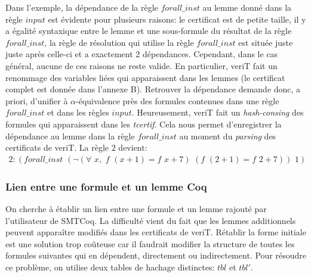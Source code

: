 \documentclass[11pt]{article}
\begin{document}
Dans l'exemple, la dépendance de la règle $forall\_inst$ au lemme donné dans la règle $input$ est évidente pour plusieurs raisons: le certificat est de petite taille, il y a égalité syntaxique entre le lemme et une sous-formule du résultat de la règle $forall\_inst$, la règle de résolution qui utilise la règle $forall\_inst$ est située juste juste après celle-ci et a exactement 2 dépendances. Cependant, dans le cas général, aucune de ces raisons ne reste valide. En particulier, veriT fait un renommage des variables liées qui apparaissent dans les lemmes (le certificat complet est donnée dans l'annexe B). Retrouver la dépendance demande donc, a priori, d'unifier à $\alpha$-équivalence près des formules contenues dans une règle $forall\_inst$ et dans les règles $input$. Heureusement, veriT fait un \textit{hash-consing} des formules qui apparaissent dans les \textit{tcertif}. Cela nous permet d'enregistrer la dépendance au lemme dans la règle $forall\_inst$ au moment du \textit{parsing} des certificats de veriT. La règle $2$ devient: 
\begin{align*}
2:(forall\_inst \,\, (\neg(\forall \,\,x, \,\,f \,\,(x+1) = f\,\,x+7) \,\,(f\,\, (2+1) = f\,\,2+7)) \,\,1) 
\end{align*}

\subsubsection{Lien entre une formule et un lemme Coq} \label{lien_formule_lemme}

On cherche à établir un lien entre une formule et un lemme rajouté par l'utilisateur de SMTCoq. La difficulté vient du fait que les lemmes additionnels peuvent apparaître modifiés dans les certificats de veriT. Rétablir la forme initiale est une solution trop coûteuse car il faudrait modifier la structure de toutes les formules suivantes qui en dépendent, directement ou indirectement. Pour résoudre ce problème, on utilise deux tables de hachage distinctes: $tbl$ et $tbl'$. \medbreak
\end{document}

